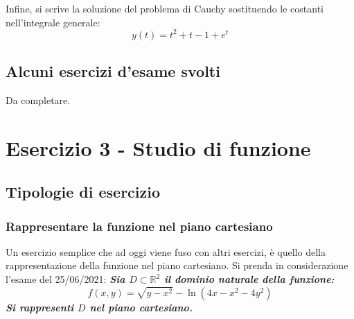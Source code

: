 \documentclass[a4paper]{article}
\begin{document}
	Infine, si scrive la soluzione del problema di Cauchy sostituendo le costanti nell'integrale generale:
	\begin{equation*}
		y\left(t\right) = t^{2} + t -1 + e^{t}
	\end{equation*}\newpage

	\subsection{Alcuni esercizi d'esame svolti}
	Da completare.
	\newpage

	\section{Esercizio 3 - Studio di funzione}

	\subsection{Tipologie di esercizio}

	\subsubsection{Rappresentare la funzione nel piano cartesiano}\label{par: rappresentare la funzione nel piano cartesiano}

	Un esercizio semplice che ad oggi viene fuso con altri esercizi, è quello della rappresentazione della funzione nel piano cartesiano. Si prenda in considerazione l'esame del 25/06/2021: \textcolor{Green4}{\textbf{\emph{Sia $D\subset\mathbb{R}^{2}$ il dominio naturale della funzione:}}
	\begin{equation*}
		f\left(x,y\right) = \sqrt{y-x^{2}}-\ln\left(4x-x^{2}-4y^{2}\right)
	\end{equation*}
	\textbf{\emph{Si rappresenti $D$ nel piano cartesiano.}}}\newline
\end{document}
